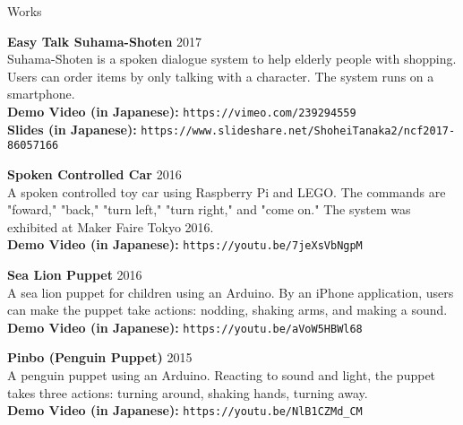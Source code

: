 \documentclass{resume} %
\begin{document}
\begin{rSection}{Works}

{\bf Easy Talk Suhama-Shoten} \hfill 2017
\\
Suhama-Shoten is a spoken dialogue system to help elderly people with shopping.
Users can order items by only talking with a character. 
The system runs on a smartphone.
\\{\bf Demo Video (in Japanese):} \texttt{https://vimeo.com/239294559}
\\{\bf Slides (in Japanese):} \texttt{https://www.slideshare.net/ShoheiTanaka2/ncf2017-86057166}


{\bf Spoken Controlled Car} \hfill 2016
\\
A spoken controlled toy car using Raspberry Pi and LEGO.
The commands are "foward," "back," "turn left," "turn right," and "come on."
The system was exhibited at Maker Faire Tokyo 2016.
\\{\bf Demo Video (in Japanese):} \texttt{https://youtu.be/7jeXsVbNgpM}

{\bf Sea Lion Puppet} \hfill 2016
\\
A sea lion puppet for children using an Arduino.
By an iPhone application, users can make the puppet take actions: nodding, shaking arms, and making a sound.
\\{\bf Demo Video (in Japanese):} \texttt{https://youtu.be/aVoW5HBWl68}

{\bf Pinbo (Penguin Puppet)} \hfill 2015
\\
A penguin puppet using an Arduino.
Reacting to sound and light, the puppet takes three actions: turning around, shaking hands, turning away.
\\{\bf Demo Video (in Japanese):} \texttt{https://youtu.be/NlB1CZMd\_CM}

\end{rSection}

\end{document}
